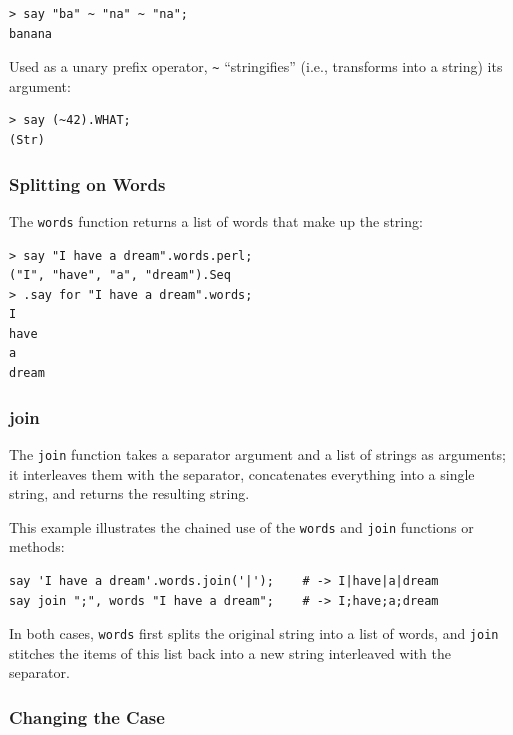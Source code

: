 \begin{verbatim}
> say "ba" ~ "na" ~ "na";
banana
\end{verbatim}
%

Used as a unary prefix operator,
\verb'~' ``stringifies'' (i.e., transforms into a string) its argument:

\begin{verbatim}
> say (~42).WHAT;
(Str)
\end{verbatim}
%

\subsubsection{Splitting on Words}

The {\tt words} function returns a list of words that make 
up the string:

\begin{verbatim}
> say "I have a dream".words.perl;
("I", "have", "a", "dream").Seq
> .say for "I have a dream".words;
I
have
a
dream
\end{verbatim}
%

\subsubsection{join}

The {\tt join} function takes a separator argument and a list 
of strings as arguments; it interleaves them with the separator, 
concatenates everything into a single string, and returns the 
resulting string.

This example illustrates the chained use of the {\tt words} and 
{\tt join} functions or methods:
\begin{verbatim}
say 'I have a dream'.words.join('|');    # -> I|have|a|dream
say join ";", words "I have a dream";    # -> I;have;a;dream
\end{verbatim}
%

In both cases, {\tt words} first splits the original 
string into a list of words, and {\tt join} stitches 
the items of this list back into a new string interleaved 
with the separator.  

\subsubsection{Changing the Case}

